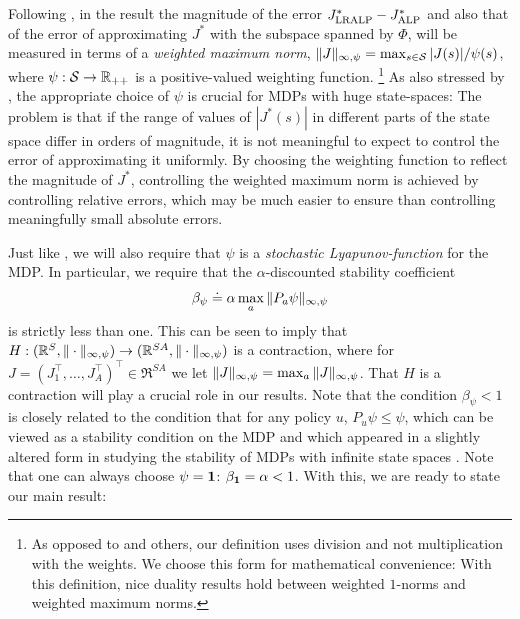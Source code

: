 Following \citet{ALP,CS}, 
in the result the magnitude of the error $\Jlro-\Jalpo$ and also that of the error
of approximating $J^*$ with the subspace spanned by $\Phi$, 
will be measured in terms of a \emph{weighted maximum norm}, 
$\norm{J}_{\infty,\psi} = \max_{s\in \S} |J(s)|/\psi(s)$, 
where $\psi: \S \to \Re_{++}$ is a positive-valued weighting function.%
\footnote{As opposed to \citet{ALP} and others, our definition uses division and not multiplication with the weights.
We choose this form for mathematical convenience:
With this definition, nice duality results hold between weighted $1$-norms and weighted maximum norms.
}
As also stressed by \citeauthor{ALP}, 
the appropriate choice of $\psi$ is crucial for MDPs with huge state-spaces:
The problem is that if the range of values of $|J^*(s)|$ in different parts of the state space
differ in orders of magnitude, it is not meaningful to expect to control the error of approximating it uniformly.
By choosing the weighting function to reflect the magnitude of $J^*$, controlling the weighted maximum norm
is achieved by controlling relative errors, which may be much easier to ensure than controlling meaningfully small
absolute errors.

Just like \citet{ALP}, we will also require that $\psi$ is a \emph{stochastic Lyapunov-function} for the MDP.  In particular, we require that the $\alpha$-discounted stability coefficient
\begin{align*}
\beta_\psi \doteq \alpha  \max_{a} \norm{P_a \psi}_{\infty,\psi}
\end{align*}
is strictly less than one.
This can be seen to imply that $H: (\Re^S,\norm{\cdot}_{\infty,\psi}) \to (\Re^{SA}, \norm{\cdot}_{\infty,\psi})$ is a contraction,
where for $J = (J_1^\top,\dots,J_A^\top)^\top \in \Re^{SA}$ we let $\norm{J}_{\infty,\psi} = \max_a\norm{J}_{\infty,\psi}$.
That $H$ is a contraction will play a crucial role in our results.
Note that the condition $\beta_\psi<1$ is closely related to the condition that for any policy $u$, 
$P_u \psi \le \psi$, which can be viewed as a stability condition on the MDP 
and which appeared in a slightly altered form in studying the stability of MDPs with infinite 
state spaces \citep[e.g.,][]{chemey99a}.
Note that one can always choose $\psi = \one$: $\beta_\one = \alpha<1$. 
With this, we are ready to state our main result:


